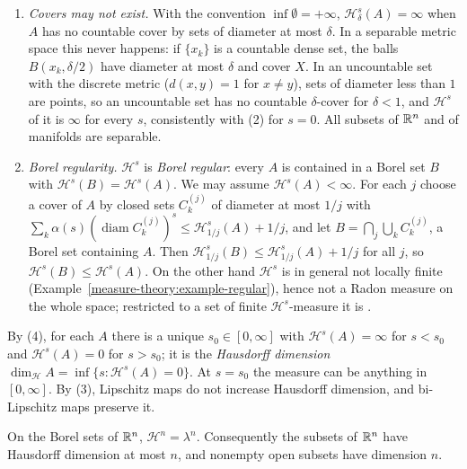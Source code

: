 \begin{remark}\label{measure-theory:remark-hausdorff-conventions}
\begin{enumerate}
\item \emph{Covers may not exist.} With the convention $\inf\emptyset = +\infty$, $\mathcal{H}^s_\delta(A) = \infty$ when $A$ has no countable cover by sets of diameter at most $\delta$. In a separable
metric space this never happens: if $\{x_k\}$ is a countable dense set, the balls $B(x_k, \delta/2)$ have diameter at most $\delta$ and cover $X$. In an uncountable set with the discrete metric
($d(x, y) = 1$ for $x \neq y$), sets of diameter less than $1$ are points, so an uncountable set has no countable $\delta$-cover for $\delta < 1$, and $\mathcal{H}^s$ of it is $\infty$ for every $s$,
consistently with (2) for $s = 0$. All subsets of $\mathbb{R}^n$ and of manifolds are separable.
\item \emph{Borel regularity.} $\mathcal{H}^s$ is \emph{Borel regular}: every $A$ is contained in a Borel set $B$ with $\mathcal{H}^s(B) = \mathcal{H}^s(A)$. We may assume $\mathcal{H}^s(A) < \infty$. For
each $j$ choose a cover of $A$ by closed sets $C^{(j)}_k$ of diameter at most $1/j$ with $\sum_k\alpha(s)(\operatorname{diam}C^{(j)}_k)^s \leq \mathcal{H}^s_{1/j}(A) + 1/j$, and let
$B = \bigcap_j\bigcup_kC^{(j)}_k$, a Borel set containing $A$. Then $\mathcal{H}^s_{1/j}(B) \leq \mathcal{H}^s_{1/j}(A) + 1/j$ for all $j$, so $\mathcal{H}^s(B) \leq \mathcal{H}^s(A)$. On the other
hand $\mathcal{H}^s$ is in general not locally finite (Example~\ref{measure-theory:example-regular}), hence not a Radon measure on the whole space; restricted to a set of finite
$\mathcal{H}^s$-measure it is \cite[Section 1.1]{evans-gariepy}.
\end{enumerate}
\end{remark}

By (4), for each $A$ there is a unique $s_0 \in [0, \infty]$ with $\mathcal{H}^s(A) = \infty$ for $s < s_0$ and $\mathcal{H}^s(A) = 0$ for $s > s_0$; it is the \emph{Hausdorff dimension}
$\dim_{\mathcal{H}}A = \inf\{s : \mathcal{H}^s(A) = 0\}$. At $s = s_0$ the measure can be anything in $[0, \infty]$. By (3), Lipschitz maps do not increase Hausdorff dimension, and
bi-Lipschitz maps preserve it.

\begin{theorem}\label{measure-theory:theorem-hausdorff-lebesgue}
On the Borel sets of $\mathbb{R}^n$, $\mathcal{H}^n = \lambda^n$. Consequently the subsets of $\mathbb{R}^n$ have Hausdorff dimension at most $n$, and nonempty open subsets have dimension $n$.
\end{theorem}


